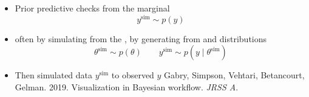\documentclass[10pt]{report}
\newcommand{\simvar}[1]{#1^{\textrm{sim}}}
\begin{document}
\begin{itemize}
\item Prior predictive checks  from the marginal
  \[
    \simvar{y} \sim p(y)
  \]
\item often by simulating from the , by generating from  and  distributions
  \[
    \simvar{\theta} \sim p(\theta)
    \qquad
    \simvar{y} \sim p(y \mid \simvar{\theta})
  \]
\item Then  simulated data $\simvar{y}$ to observed $y$
  \vfill
  {\footnotesize Gabry, Simpson, Vehtari, Betancourt,
    Gelman. 2019. Visualization in Bayesian workflow. \textit{JRSS A}.}
\end{itemize}

\end{document}
